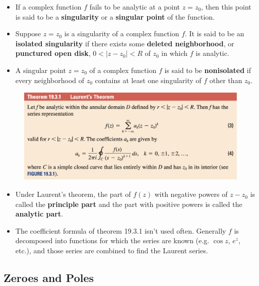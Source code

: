 \documentclass{article}
\begin{document}
\begin{itemize}
  \item If a complex function $f$ fails to be analytic at a point $z = z_0$, then this point is said to be a \textbf{singularity} or a \textbf{singular point} of the function.

  \item Suppose $z = z_0$ is a singularity of a complex function $f$. It is said to be an \textbf{isolated singularity} if there exists some \textbf{deleted neighborhood}, or \textbf{punctured open disk}, $0 < |z - z_0| < R$ of $z_0$ in which $f$ is analytic.

  \item A singular point $z = z_0$ of a complex function $f$ is said to be \textbf{nonisolated} if every neighborhood of $z_0$ contains at least one singularity of $f$ other than $z_0$.
\end{itemize}

\begin{figure}[H]
  \centering
  \includegraphics[width=\textwidth]{laurents-theorem}
\end{figure}

\begin{itemize}
  \item Under Laurent's theorem, the part of $f(z)$ with negative powers of $z - z_0$ is called the \textbf{principle part} and the part with positive powers is called the \textbf{analytic part}.

  \item The coefficient formula of theorem 19.3.1 isn't used often. Generally $f$ is decomposed into functions for which the series are known (e.g. $\cos z$, $e^z$, etc.), and those series are combined to find the Laurent series.
\end{itemize}

\subsection{Zeroes and Poles}
\end{document}
